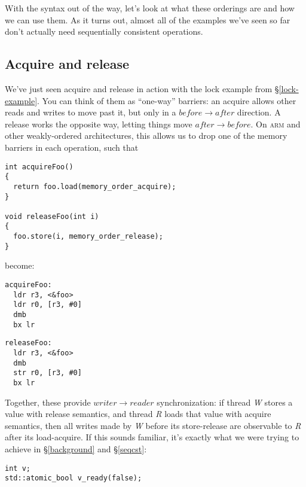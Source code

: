 \documentclass[fontsize=\bodyfontsize, numbers=endperiod]{scrartcl}
\newcommand{\codesize}{\fontsize{\bodyfontsize}{\bodybaselineskip}}
\newcommand{\secref}[1]{\hyperref[#1]{\textsc{\S}\ref*{#1}}}
\newenvironment{colfigure}
  {\par\vspace{1\baselineskip minus 0.5\baselineskip}\noindent\minipage{\linewidth}}
  {\endminipage\vspace{1\baselineskip minus 0.7\baselineskip}}
\begin{document}
\begin{multicols}{2}
With the syntax out of the way,
let's look at what these orderings are and how we can use them.
As it turns out, almost all of the examples we've seen so far don't actually
need sequentially consistent operations.

\subsection{Acquire and release}

We've just seen acquire and release in action with the
lock example from \secref{lock-example}.
You can think of them as ``one-way'' barriers:
an acquire allows other reads and writes to move past it,
but only in a $before \to after$ direction.
A release works the opposite way,
letting things move $after \to before$.
On \textsc{arm} and other weakly-ordered architectures, this allows us to drop
one of the memory barriers in each operation, such that

\begin{colfigure}
\begin{verbatim}
int acquireFoo()
{
  return foo.load(memory_order_acquire);
}

void releaseFoo(int i)
{
  foo.store(i, memory_order_release);
}
\end{verbatim}
\end{colfigure}
become:
\begin{colfigure}
\begin{minipage}{0.45\linewidth}
\begin{lstlisting}[language={[ARM]Assembler}]
acquireFoo:
  ldr r3, <&foo>
  ldr r0, [r3, #0]
  dmb
  bx lr
\end{lstlisting}
\end{minipage}
\begin{minipage}{0.45\linewidth}
\begin{lstlisting}[language={[ARM]Assembler}]
releaseFoo:
  ldr r3, <&foo>
  dmb
  str r0, [r3, #0]
  bx lr
\end{lstlisting}
\end{minipage}
\end{colfigure}

Together, these provide $writer \to reader$ synchronization:
if thread \textit{W} stores a value with release semantics,
and thread \textit{R} loads that value with acquire semantics,
then all writes made by \textit{W} before its store-release are observable to
\textit{R} after its load-acquire.
If this sounds familiar, it's exactly what we were trying to achieve in
\secref{background} and \secref{seqcst}:
\begin{colfigure}
\begin{verbatim}
int v;
std::atomic_bool v_ready(false);


\end{verbatim}
\end{colfigure}
\end{multicols}
\end{document}
